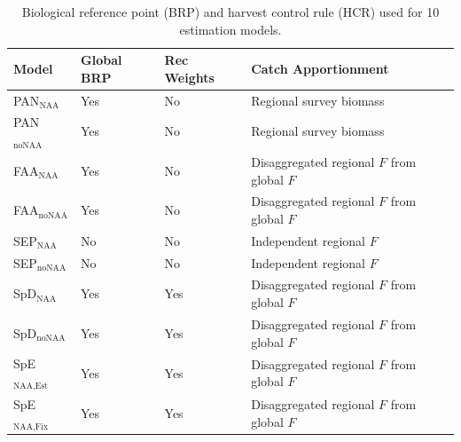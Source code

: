 \begin{table}[H]
    \centering
    \caption{Biological reference point (BRP) and harvest control rule (HCR) used for 10 estimation models.}
    \label{HCR_table}
    \begin{tabular}{p{2cm} p{2cm} p{2cm} p{8cm}}
        \toprule
        \textbf{Model} & \textbf{Global BRP} & \textbf{Rec Weights} & \textbf{Catch Apportionment} \\
        \midrule
        PAN$_{\text{NAA}}$ & Yes & No & Regional survey biomass \\
        PAN$_{\text{noNAA}}$ & Yes & No & Regional survey biomass \\
        FAA$_{\text{NAA}}$ & Yes & No & Disaggregated regional $F$ from global $F$\\
        FAA$_{\text{noNAA}}$ & Yes & No & Disaggregated regional $F$ from global $F$ \\
        SEP$_{\text{NAA}}$ & No & No & Independent regional $F$ \\
        SEP$_{\text{noNAA}}$ & No & No & Independent regional $F$ \\
        SpD$_{\text{NAA}}$ & Yes & Yes & Disaggregated regional $F$ from global $F$ \\
        SpD$_{\text{noNAA}}$ & Yes & Yes & Disaggregated regional $F$ from global $F$ \\
        SpE$_{\text{NAA,Est}}$ & Yes & Yes & Disaggregated regional $F$ from global $F$ \\
        SpE$_{\text{NAA,Fix}}$ & Yes & Yes & Disaggregated regional $F$ from global $F$ \\
        \bottomrule
    \end{tabular}
\end{table}